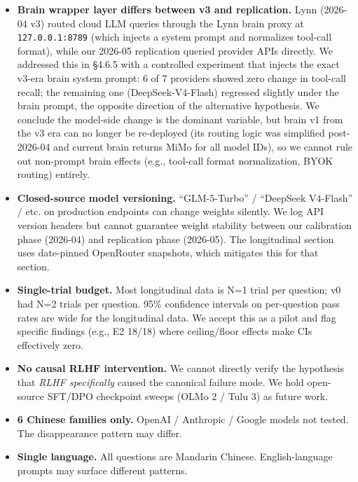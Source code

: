\documentclass[11pt]{article}
\providecommand{\passthrough}[1]{#1}
\begin{document}
\begin{itemize}
\item
  \textbf{Brain wrapper layer differs between v3 and replication.} Lynn
  (2026-04 v3) routed cloud LLM queries through the Lynn brain proxy at
  \passthrough{\lstinline!127.0.0.1:8789!} (which injects a system
  prompt and normalizes tool-call format), while our 2026-05 replication
  queried provider APIs directly. We addressed this in §4.6.5 with a
  controlled experiment that injects the exact v3-era brain system
  prompt: 6 of 7 providers showed zero change in tool-call recall; the
  remaining one (DeepSeek-V4-Flash) regressed slightly under the brain
  prompt, the opposite direction of the alternative hypothesis. We
  conclude the model-side change is the dominant variable, but brain v1
  from the v3 era can no longer be re-deployed (its routing logic was
  simplified post-2026-04 and current brain returns MiMo for all model
  IDs), so we cannot rule out non-prompt brain effects (e.g., tool-call
  format normalization, BYOK routing) entirely.
\item
  \textbf{Closed-source model versioning.} ``GLM-5-Turbo'' / ``DeepSeek
  V4-Flash'' / etc. on production endpoints can change weights silently.
  We log API version headers but cannot guarantee weight stability
  between our calibration phase (2026-04) and replication phase
  (2026-05). The longitudinal section uses date-pinned OpenRouter
  snapshots, which mitigates this for that section.
\item
  \textbf{Single-trial budget.} Most longitudinal data is N=1 trial per
  question; v0 had N=2 trials per question. 95\% confidence intervals on
  per-question pass rates are wide for the longitudinal data. We accept
  this as a pilot and flag specific findings (e.g., E2 18/18) where
  ceiling/floor effects make CIs effectively zero.
\item
  \textbf{No causal RLHF intervention.} We cannot directly verify the
  hypothesis that \emph{RLHF specifically} caused the canonical failure
  mode. We hold open-source SFT/DPO checkpoint sweeps (OLMo 2 / Tulu 3)
  as future work.
\item
  \textbf{6 Chinese families only.} OpenAI / Anthropic / Google models
  not tested. The disappearance pattern may differ.
\item
  \textbf{Single language.} All questions are Mandarin Chinese.
  English-language prompts may surface different patterns.
\end{itemize}
\end{document}
